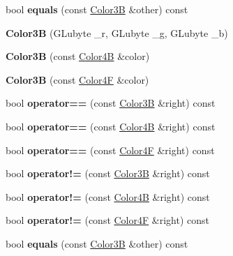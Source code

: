 \begin{DoxyCompactItemize}
\item 
\mbox{\label{structColor3B_a54bcd567a747660e3719986cf5c007fc}} 
bool {\bfseries equals} (const \hyperlink{structColor3B}{Color3B} \&other) const
\item 
\mbox{\label{structColor3B_af54ca53b126e684f0d0a0939e8b9a825}} 
{\bfseries Color3B} (G\+Lubyte \+\_\+r, G\+Lubyte \+\_\+g, G\+Lubyte \+\_\+b)
\item 
\mbox{\label{structColor3B_aae1644a34d0da536c8dab2e273b7943b}} 
{\bfseries Color3B} (const \hyperlink{structColor4B}{Color4B} \&color)
\item 
\mbox{\label{structColor3B_afcc265c9313e53defcb6b0b8c33a3eb9}} 
{\bfseries Color3B} (const \hyperlink{structColor4F}{Color4F} \&color)
\item 
\mbox{\label{structColor3B_acdcdc62fd4de7ad43c51b8cce1523589}} 
bool {\bfseries operator==} (const \hyperlink{structColor3B}{Color3B} \&right) const
\item 
\mbox{\label{structColor3B_a63f025afa2f24de1fa9fb23359a9a7bd}} 
bool {\bfseries operator==} (const \hyperlink{structColor4B}{Color4B} \&right) const
\item 
\mbox{\label{structColor3B_a4e8034e6ec340ffbf9e8c3f9793117d9}} 
bool {\bfseries operator==} (const \hyperlink{structColor4F}{Color4F} \&right) const
\item 
\mbox{\label{structColor3B_aa10d737d3b4a62e9cdd2d15a28973555}} 
bool {\bfseries operator!=} (const \hyperlink{structColor3B}{Color3B} \&right) const
\item 
\mbox{\label{structColor3B_ab633b847b14fde6f7a605cda46938d0d}} 
bool {\bfseries operator!=} (const \hyperlink{structColor4B}{Color4B} \&right) const
\item 
\mbox{\label{structColor3B_a905040bdac0286913e4474630eaa125b}} 
bool {\bfseries operator!=} (const \hyperlink{structColor4F}{Color4F} \&right) const
\item 
\mbox{\label{structColor3B_a54bcd567a747660e3719986cf5c007fc}} 
bool {\bfseries equals} (const \hyperlink{structColor3B}{Color3B} \&other) const
\end{DoxyCompactItemize}
